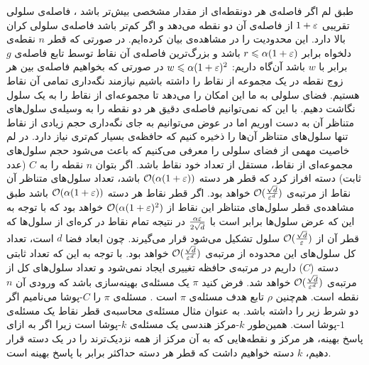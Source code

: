 طبق لم  اگر فاصله‌ی هر دونقطه‌ای از مقدار مشخصی بیش‌تر باشد ، فاصله‌ی سلولی تقریبی $1+\varepsilon$ از فاصله‌ی آن دو نقطه می‌دهد و اگر کم‌تر باشد فاصله‌ی سلولی کران بالا دارد. این محدودیت را در مشاهده‌ی  بیان کرده‌ایم.
در صورتی که قطر $n$ نقطه‌ی دلخواه برابر 
$ r \leqslant \alpha (1+\varepsilon)$
باشد و بزرگ‌ترین فاصله‌ی آن نقاط توسط تابع فاصله‌ی $g$ برابر با $w$ باشد آن‌گاه داریم: 
$ w \leqslant \alpha (1+\varepsilon)^2 $ 
در صورتی که بخواهیم فاصله‌ی بین هر زوج نقطه در یک مجموعه از نقاط را داشته باشیم نیازمند نگه‌داری تمامی آن نقاط هستیم. فضای سلولی به ما این امکان را می‌دهد تا مجموعه‌ای از نقاط را به یک سلول نگاشت دهیم. با این که نمی‌توانیم فاصله‌ی دقیق هر دو نقطه را به وسیله‌ی سلول‌های متناظر آن به دست اوریم اما در عوض می‌توانیم به جای نگه‌داری حجم زیادی از نقاط تنها سلول‌های متناظر آن‌ها را ذخیره کنیم که حافظه‌ی بسیار کم‌تری نیاز دارد. در لم  خاصیت مهمی از فضای سلولی را معرفی می‌کنیم که باعث می‌شود حجم سلول‌های مجموعه‌ای از نقاط، مستقل از تعداد خود نقاط باشد.
اگر بتوان $n$ نقطه‌ را به $C$ (عدد ثابت) دسته‌ افراز کرد که قطر هر دسته 
$ \mathcal{O}(\alpha (1+\varepsilon)) $
باشد، تعداد سلول‌های متناظر آن نقاط از مرتبه‌ی
$ \mathcal{O}(\frac{\sqrt{d}}{\varepsilon^d})$ 
خواهد بود.
اگر قطر نقاط هر دسته 
$\mathcal{O}( \alpha (1+ \varepsilon))$
باشد طبق مشاهده‌ی  قطر سلول‌های متناظر این نقاط از 
$\mathcal{O}( \alpha (1+\varepsilon)^2)$
خواهد بود که با توجه به این که عرض سلول‌ها برابر است با
$ \frac{\alpha \varepsilon}{2 \sqrt{d}}$
در نتیجه تمام نقاط در کره‌ای از سلول‌ها که قطر آن از 
$ \mathcal{O}(\frac{\sqrt{d}}{\varepsilon})$
سلول تشکیل می‌شود قرار می‌گیرند. چون ابعاد فضا $d$ است، تعداد کل سلول‌های این محدوده از مرتبه‌ی
$ \mathcal{O}(\frac{\sqrt{d}}{\varepsilon^d})$ 
خواهد بود. با توجه به این که تعداد ثابتی دسته ($C$) داریم در مرتبه‌ی حافظه تغییری ایجاد نمی‌شود و تعداد سلول‌های کل از مرتبه‌ی
$ \mathcal{O}(\frac{\sqrt{d}}{\varepsilon^d})$ 
خواهد شد.
فرض کنید $\pi$ یک مسئله‌ی بهینه‌سازی باشد که ورودی آن $n$ نقطه است. هم‌چنین $\rho$ تابع هدف مسئله‌ی $\pi$ است . مسئله‌ی $\pi$ را $C$-پوشا می‌نامیم اگر دو شرط زیر را داشته باشد.
به عنوان مثال مسئله‌ی محاسبه‌ی قطر نقاط یک مسئله‌ی $1$-پوشا است. همین‌طور $k$-مرکز هندسی یک مسئله‌ی $k$-پوشا است زیرا اگر به ازای پاسخ بهینه، هر مرکز و نقطه‌هایی که به آن مرکز از همه نزدیک‌ترند را در یک دسته قرار دهیم، $k$ دسته خواهیم داشت که قطر هر دسته حداکثر برابر با پاسخ بهینه است.


